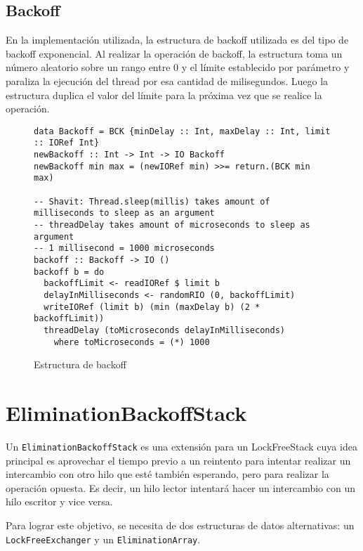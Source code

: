 \subsection{Backoff}
En la implementación utilizada, la estructura de backoff utilizada es del tipo de backoff exponencial. Al realizar la operación de backoff, la estructura toma un número aleatorio sobre un rango entre 0 y el límite establecido por parámetro y paraliza la ejecución del thread por esa cantidad de milisegundos. Luego la estructura duplica el valor del límite para la próxima vez que se realice la operación.
\begin{figure}[H]
\begin{verbatim}
data Backoff = BCK {minDelay :: Int, maxDelay :: Int, limit :: IORef Int}
newBackoff :: Int -> Int -> IO Backoff
newBackoff min max = (newIORef min) >>= return.(BCK min max)

-- Shavit: Thread.sleep(millis) takes amount of milliseconds to sleep as an argument
-- threadDelay takes amount of microseconds to sleep as argument
-- 1 millisecond = 1000 microseconds
backoff :: Backoff -> IO ()
backoff b = do
  backoffLimit <- readIORef $ limit b
  delayInMilliseconds <- randomRIO (0, backoffLimit)
  writeIORef (limit b) (min (maxDelay b) (2 * backoffLimit))
  threadDelay (toMicroseconds delayInMilliseconds)
    where toMicroseconds = (*) 1000
\end{verbatim}
\caption{Estructura de backoff}
\end{figure}

\clearpage
\section{EliminationBackoffStack}

Un \texttt{EliminationBackoffStack} es una extensión para un LockFreeStack cuya idea principal es aprovechar el tiempo previo a un reintento para intentar realizar un intercambio con otro hilo que esté también esperando, pero para realizar la operación opuesta. Es decir, un hilo lector intentará hacer un intercambio con un hilo escritor y vice versa.

Para lograr este objetivo, se necesita de dos estructuras de datos alternativas: un \texttt{LockFreeExchanger} y un \texttt{EliminationArray}.


